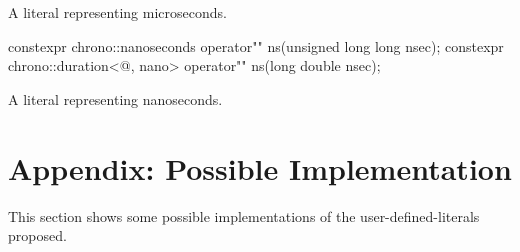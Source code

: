\documentclass[ebook,11pt,article]{memoir}
\begin{document}
\begin{itemdescr}
\pnum
\returns
A  literal representing  microseconds. 
\end{itemdescr}

\begin{itemdecl}
constexpr 
chrono::nanoseconds operator"" ns(unsigned long long nsec);
constexpr 
chrono::duration<@\unspec@, nano> operator"" ns(long double nsec);
\end{itemdecl}

\begin{itemdescr}
\pnum
\returns
A  literal representing  nanoseconds. 
\end{itemdescr}



\newpage
\chapter{Appendix: Possible Implementation}
This section shows some possible implementations of the user-defined-literals proposed.
\end{document}
